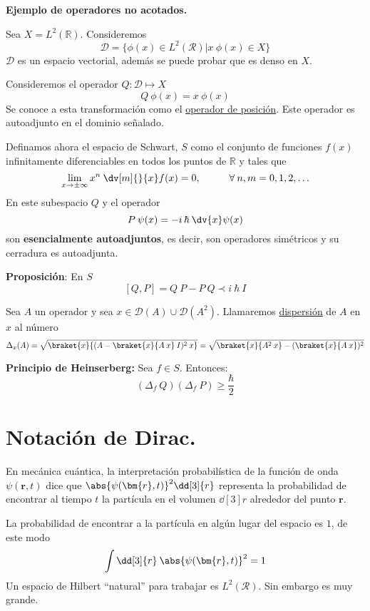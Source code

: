 \textbf{Ejemplo de operadores no acotados.}
\begin{ejemplo}
Sea $X = L^{2}(\mathbb{R})$. Consideremos
\[ \mathcal{D} = \{ \phi (x) \in L^{2}(\mathcal{R}) \vert x \: \phi (x) \in X \} \]
$\mathcal{D}$ es un espacio vectorial, además se puede probar que es denso en $X$.
\par
Consideremos el operador $Q: \mathcal{D} \mapsto X$
\[ Q \: \phi(x) =  x \: \phi (x) \]
Se conoce a esta transformación como el \underline{operador de posición}. Este operador es autoadjunto en el dominio señalado.
\end{ejemplo}
\begin{ejemplo}
Definamos ahora el espacio de Schwart, $S$ como el conjunto de funciones $f(x)$ infinitamente diferenciables en todos los puntos de $\mathbb{R}$ y tales que
\[ \lim_{x \to \pm \infty} x^{n} \: \dv[m]{}{x} f(x) = 0, \hspace{1cm} \forall \: n, m = 0, 1, 2, \ldots \]
En este subespacio $Q$ y el operador
\[ P \: \psi (x) = - i \, \hbar \: \dv{x} \psi (x) \]
son \textbf{esencialmente autoadjuntos}, es decir, son operadores simétricos y su cerradura es autoadjunta.
\end{ejemplo}
\textbf{Proposición}: En $S$
\[ [Q, P] = Q \: P - P \: Q \prec i \: \hbar \: I \]
\begin{defi}
Sea $A$ un operador y sea $x \in \mathcal{D}(A) \cup \mathcal{D}(A^{2})$. Llamaremos \underline{dispersión} de $A$ en $x$ al número
\[ \Delta_{x} (A) = \sqrt{\braket{x}{(A - \braket{x}{A \: x} \: I)^{2} \: x}} = \sqrt{\braket{x}{A^{2} \: x} - (\braket{x}{A \: x})^{2}} \]
\end{defi}
\textbf{Principio de Heinserberg:} Sea $f \in S$. Entonces:
\[ (\Delta_{f} \: Q)(\Delta_{f} \: P) \geq \dfrac{\hbar}{2} \]
\section{Notación de Dirac.}
En mecánica cuántica, la interpretación probabilística de la
función de onda $\psi (\bm{r}, t)$ dice que $\abs{\psi (\bm{r}, t)}^{2} \dd[3]{r}$ representa la
probabilidad de encontrar al tiempo $t$ la partícula en el volumen $\dd[3]{r}$ alrededor del punto $\bm{r}$.
\par
La probabilidad de encontrar a la partícula en algún lugar del espacio es $1$, de este modo
\[ \int \dd[3]{r} \: \abs{\psi (\bm{r}, t)}^{2} = 1 \]
Un espacio de Hilbert \enquote{natural} para trabajar es $L^{2} (\mathcal{R})$. Sin embargo es muy grande. 

